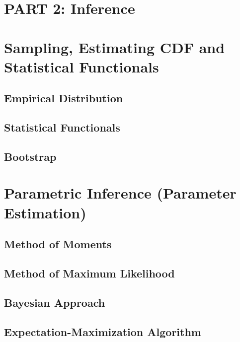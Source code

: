 \documentclass[
  openany]{book}
\theoremstyle{definition}
\theoremstyle{definition}
\theoremstyle{definition}
\theoremstyle{definition}
\theoremstyle{remark}
\begin{document}
\chapter*{PART 2: Inference}\label{part-2-inference}


\chapter{Sampling, Estimating CDF and Statistical Functionals}\label{sampling-estimating-cdf-and-statistical-functionals}

\section{Empirical Distribution}\label{empirical-distribution}

\section{Statistical Functionals}\label{statistical-functionals}

\section{Bootstrap}\label{bootstrap}

\chapter{Parametric Inference (Parameter Estimation)}\label{parametric-inference-parameter-estimation}

\section{Method of Moments}\label{method-of-moments}

\section{Method of Maximum Likelihood}\label{method-of-maximum-likelihood}

\section{Bayesian Approach}\label{bayesian-approach}

\section{Expectation-Maximization Algorithm}\label{expectation-maximization-algorithm}
\end{document}
